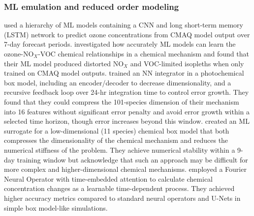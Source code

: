 \documentclass[gmd, manuscript]{copernicus}
\begin{document}
\subsubsection{ML emulation and reduced order modeling}
\citet{Xing2020} used a hierarchy of ML models containing a CNN and long short-term memory (LSTM) network to predict ozone concentrations from CMAQ model output over 7-day forecast periods. \citet{kuo_ozone_2023} investigated how accurately ML models can learn the ozone-NO$_X$-VOC chemical relationships in a chemical mechanism and found that their ML model produced distorted NO$_X$ and VOC-limited isopleths when only trained on CMAQ model outputs. \citet{kelp_online-learned_2022} trained an NN integrator in a photochemical box model, including an encoder/decoder to decrease dimensionality, and a recursive feedback loop over 24-hr integration time to control error growth. They found that they could compress the 101-species dimension of their mechanism into 16 features without significant error penalty and avoid error growth within a selected time horizon, though error increases beyond this window. \citet{yang_atmospheric_2024} created an ML surrogate for a low-dimensional (11 species) chemical box model that both compresses the dimensionality of the chemical mechanism and reduces the numerical stiffness of the problem. They achieve numerical stability within a 9-day training window but acknowledge that such an approach may be difficult for more complex and higher-dimensional chemical mechanisms. \citet{liu_neural_2024} employed a Fourier Neural Operator with time-embedded attention to calculate chemical concentration changes as a learnable time-dependent process. They achieved higher accuracy metrics compared to standard neural operators and U-Nets in simple box model-like simulations. 
\end{document}
